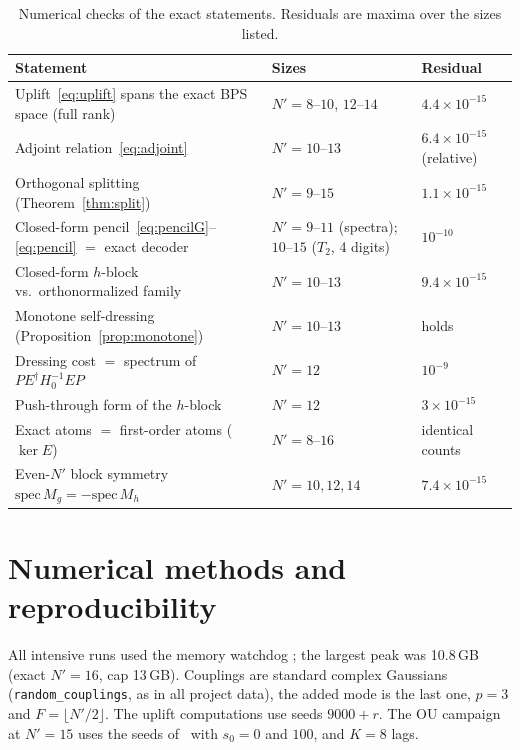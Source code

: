\documentclass[11pt]{article}
\newcommand{\Np}{N'}
\theoremstyle{plain}
\theoremstyle{remark}
\numberwithin{equation}{section}
\begin{document}
\begin{table}[ht]
\centering\small
\caption{Numerical checks of the exact statements. Residuals are maxima over the sizes listed.}
\label{tab:verify}
\begin{tabular}{@{}>{\raggedright\arraybackslash}p{}>{\raggedright\arraybackslash}p{}l@{}}\toprule
Statement & Sizes & Residual\\\midrule
Uplift~\eqref{eq:uplift} spans the exact BPS space (full rank) & $\Np=8$--$10$, $12$--$14$ & $4.4\times10^{-15}$\\
Adjoint relation~\eqref{eq:adjoint} & $\Np=10$--$13$ & $6.4\times10^{-15}$ (relative)\\
Orthogonal splitting (Theorem~\ref{thm:split}) & $\Np=9$--$15$ & $1.1\times10^{-15}$\\
Closed-form pencil~\eqref{eq:pencilG}--\eqref{eq:pencil} $=$ exact decoder & $\Np=9$--$11$ (spectra); $10$--$15$ ($T_2$, 4 digits) & $10^{-10}$\\
Closed-form $h$-block vs.\ orthonormalized family & $\Np=10$--$13$ & $9.4\times10^{-15}$\\
Monotone self-dressing (Proposition~\ref{prop:monotone}) & $\Np=10$--$13$ & holds\\
Dressing cost $=$ spectrum of $P E^\dagger H_0^{-1}EP$ & $\Np=12$ & $10^{-9}$\\
Push-through form of the $h$-block & $\Np=12$ & $3\times10^{-15}$\\
Exact atoms $=$ first-order atoms ($\ker E$) & $\Np=8$--$16$ & identical counts\\
Even-$\Np$ block symmetry $\mathrm{spec}\,M_g=-\mathrm{spec}\,M_h$ & $\Np=10,12,14$ & $7.4\times10^{-15}$\\\bottomrule
\end{tabular}
\end{table}

\section{Numerical methods and reproducibility}\label{app:repro}

All intensive runs used the memory watchdog ; the largest peak was 10.8\,GB (exact
$\Np=16$, cap 13\,GB). Couplings are standard complex Gaussians (\texttt{random\_couplings}, as in all project data),
the added mode is the last one, $p=3$ and $F=\lfloor\Np/2\rfloor$. The uplift computations use seeds $9000+r$. The OU
campaign at $\Np=15$ uses the seeds of~\cite{prog1005} with $s_0=0$ and $100$, and $K=8$ lags.
\end{document}
